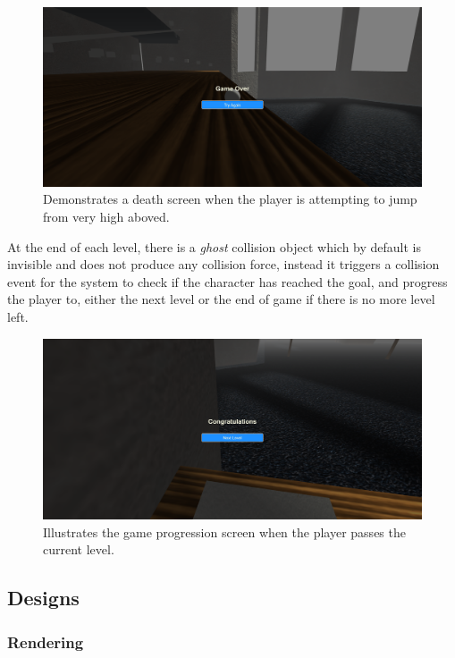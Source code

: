 \documentclass[12pt, a4paper, oneside]{article}
\begin{document}
    \begin{figure}[H]
        \includegraphics[width=\textwidth]{death.png}
        \caption{Demonstrates a death screen when the player is attempting to jump from very high aboved.}
    \end{figure}

    At the end of each level, there is a \textit{ghost} collision object which by default is invisible and does not produce any collision force, instead it triggers a collision event for the system to check if the character has reached the goal, and progress the player to, either the next level or the end of game if there is no more level left.

    \begin{figure}[H]
        \includegraphics[width=\textwidth]{progress.png}
        \caption{Illustrates the game progression screen when the player passes the current level.}
    \end{figure}

    \subsection{Designs}

    \subsubsection{Rendering}
\end{document}

